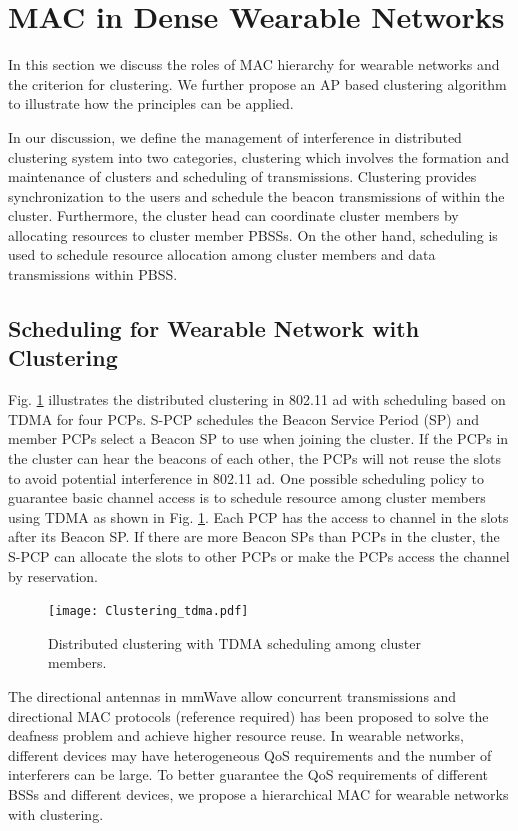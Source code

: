 \documentclass[10pt, conference, letterpaper]{IEEEtran}
\begin{document}
\section{MAC in Dense Wearable Networks}\label{section:MAC}
In this section we discuss the roles of MAC hierarchy for wearable networks and the criterion for clustering. We further propose an AP based clustering algorithm to illustrate how the principles can be applied. 

In our discussion, we define the management of interference in distributed clustering system into two categories, clustering which involves the formation and maintenance of clusters and scheduling of transmissions. Clustering provides synchronization to the users and schedule the beacon transmissions of within the cluster. Furthermore, the cluster head can coordinate cluster members by allocating resources to cluster member PBSSs. On the other hand, scheduling is used to schedule resource allocation among cluster members and data transmissions within PBSS.

\subsection{Scheduling for Wearable Network with Clustering}\label{section:MAC:scheduling}

Fig. \ref{fig:clustering:tdma} illustrates the distributed clustering in 802.11 ad with scheduling based on TDMA for four PCPs. S-PCP schedules the Beacon Service Period (SP) and member PCPs select a Beacon SP to use when joining the cluster. If the PCPs in the cluster can hear the beacons of each other, the PCPs will not reuse the slots to avoid potential interference in 802.11 ad. One possible scheduling policy to guarantee basic channel access is to schedule resource among cluster members using TDMA as shown in Fig.  \ref{fig:clustering:tdma}. Each PCP has the access to channel in the slots after its Beacon SP. If there are more Beacon SPs than PCPs in the cluster, the S-PCP can allocate the slots to other PCPs or make the PCPs access the channel by reservation.

\begin{figure}
	\centering
	\texttt{[image: Clustering\_tdma.pdf]}
	\caption{Distributed clustering with TDMA scheduling among cluster members.}
	\label{fig:clustering:tdma}
\end{figure}

The directional antennas in mmWave allow concurrent transmissions and directional MAC protocols (reference required) has been proposed to solve the deafness problem and achieve higher resource reuse. In wearable networks, different devices may have heterogeneous QoS requirements and the number of interferers can be large. To better guarantee the QoS requirements of different BSSs and different devices, we propose a hierarchical MAC for wearable networks with clustering.
\end{document}
